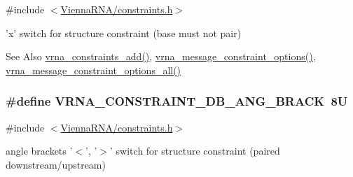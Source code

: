 {\ttfamily \#include $<$\hyperlink{constraints_8h}{Vienna\-R\-N\-A/constraints.\-h}$>$}



'x' switch for structure constraint (base must not pair) 

\begin{DoxySeeAlso}{See Also}
\hyperlink{group__constraints_ga35a401f680969a556858a8dd5f1d07cc}{vrna\-\_\-constraints\-\_\-add()}, \hyperlink{group__constraints_gaa1f20b53bf09ac2e6b0dbb13f7d89670}{vrna\-\_\-message\-\_\-constraint\-\_\-options()}, \hyperlink{group__constraints_gaec7e13fa0465c2acc7a621d1aecb709f}{vrna\-\_\-message\-\_\-constraint\-\_\-options\-\_\-all()} 
\end{DoxySeeAlso}
\hypertarget{group__constraints_gad54c1315a47d55653dcaa5de6e544b77}{
\subsubsection[{V\-R\-N\-A\-\_\-\-C\-O\-N\-S\-T\-R\-A\-I\-N\-T\-\_\-\-D\-B\-\_\-\-A\-N\-G\-\_\-\-B\-R\-A\-C\-K}]{\setlength{\rightskip}{0pt plus 5cm}\#define V\-R\-N\-A\-\_\-\-C\-O\-N\-S\-T\-R\-A\-I\-N\-T\-\_\-\-D\-B\-\_\-\-A\-N\-G\-\_\-\-B\-R\-A\-C\-K~8\-U}}\label{group__constraints_gad54c1315a47d55653dcaa5de6e544b77}


{\ttfamily \#include $<$\hyperlink{constraints_8h}{Vienna\-R\-N\-A/constraints.\-h}$>$}



angle brackets '$<$', '$>$' switch for structure constraint (paired downstream/upstream) 

